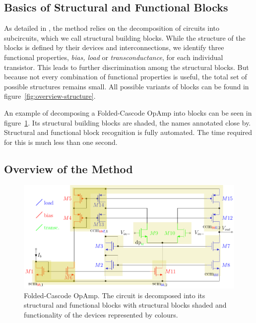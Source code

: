\documentclass[conference]{IEEEtran}
\begin{document}
 	\subsection{Basics of Structural and Functional Blocks}
 	As detailed in \cite{ leibl24inverse}, the method  relies on the decomposition of circuits into subcircuits, which we call structural building blocks.
 	While the structure of the blocks is defined by their devices and interconnections, we identify three functional properties, \textit{bias, load} or \textit{transconductance}, for each individual transistor. This leads to further discrimination among the structural blocks. But because not every combination of functional properties is useful, the total set of possible structures remains small. 
	All possible variants of blocks can be found in figure~\ref{fig:overview-structure}.
	
	An example of decomposing a Folded-Cascode OpAmp into blocks can be seen in figure~\ref{fig:simple53}. Its structural building blocks are shaded, the names annotated close by.
	Structural and functional block recognition is fully automated. The time required for this is much less than one second. 
	
\subsection{Overview of the Method}
	\begin{figure}[]
		\centering
		\includegraphics[width=\linewidth]{figures/simple52_partitioning}
		\caption{Folded-Cascode OpAmp. The circuit is decomposed into its structural and functional blocks with structural blocks shaded and functionality of the devices represented by colours. }
		\label{fig:simple53}
	\end{figure}
	
\end{document}
